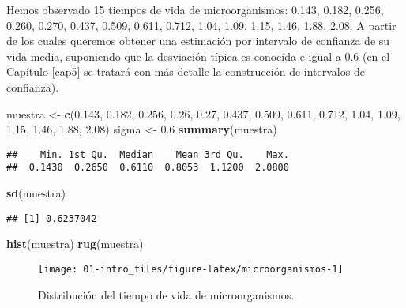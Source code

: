 \documentclass[
]{book}
\newenvironment{Shaded}{\begin{snugshade}}{\end{snugshade}}
\newcommand{\FloatTok}[1]{\textcolor[rgb]{0.00,0.00,0.81}{#1}}
\newcommand{\KeywordTok}[1]{\textcolor[rgb]{0.13,0.29,0.53}{\textbf{#1}}}
\newcommand{\NormalTok}[1]{#1}
\newcommand{\StringTok}[1]{\textcolor[rgb]{0.31,0.60,0.02}{#1}}
\theoremstyle{definition}
\theoremstyle{definition}
\theoremstyle{definition}
\theoremstyle{remark}
\begin{document}
Hemos observado 15 tiempos de vida de microorganismos:
0.143, 0.182, 0.256, 0.260, 0.270, 0.437, 0.509,
0.611, 0.712, 1.04, 1.09, 1.15, 1.46, 1.88, 2.08.
A partir de los cuales queremos
obtener una estimación por intervalo de confianza de su vida media,
suponiendo que la desviación típica es conocida e igual a 0.6
(en el Capítulo \ref{cap5} se tratará con más detalle la construcción de intervalos de confianza).

\begin{Shaded}
\begin{Highlighting}[]
\NormalTok{muestra <-}\StringTok{ }\KeywordTok{c}\NormalTok{(}\FloatTok{0.143}\NormalTok{, }\FloatTok{0.182}\NormalTok{, }\FloatTok{0.256}\NormalTok{, }\FloatTok{0.26}\NormalTok{, }\FloatTok{0.27}\NormalTok{, }\FloatTok{0.437}\NormalTok{, }\FloatTok{0.509}\NormalTok{, }
    \FloatTok{0.611}\NormalTok{, }\FloatTok{0.712}\NormalTok{, }\FloatTok{1.04}\NormalTok{, }\FloatTok{1.09}\NormalTok{, }\FloatTok{1.15}\NormalTok{, }\FloatTok{1.46}\NormalTok{, }\FloatTok{1.88}\NormalTok{, }\FloatTok{2.08}\NormalTok{)}
\NormalTok{sigma <-}\StringTok{ }\FloatTok{0.6}
\KeywordTok{summary}\NormalTok{(muestra)}
\end{Highlighting}
\end{Shaded}

\begin{verbatim}
##    Min. 1st Qu.  Median    Mean 3rd Qu.    Max. 
##  0.1430  0.2650  0.6110  0.8053  1.1200  2.0800
\end{verbatim}

\begin{Shaded}
\begin{Highlighting}[]
\KeywordTok{sd}\NormalTok{(muestra)}
\end{Highlighting}
\end{Shaded}

\begin{verbatim}
## [1] 0.6237042
\end{verbatim}

\begin{Shaded}
\begin{Highlighting}[]
\KeywordTok{hist}\NormalTok{(muestra)}
\KeywordTok{rug}\NormalTok{(muestra)}
\end{Highlighting}
\end{Shaded}

\begin{figure}[!htb]

{\centering \texttt{[image: 01-intro\_files/figure-latex/microorganismos-1]} 

}

\caption{Distribución del tiempo de vida de microorganismos.}\label{fig:microorganismos}
\end{figure}
\end{document}

